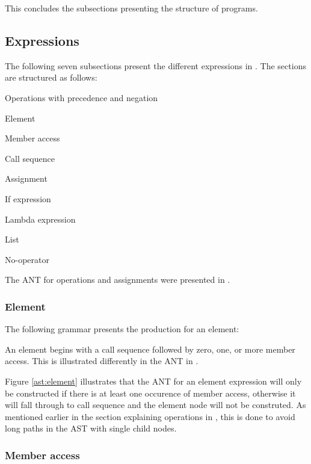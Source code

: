 This concludes the subsections presenting the structure of programs.

\subsection{Expressions}
The following seven subsections present the different expressions in
\productname{}. The sections are structured as follows:

\begin{dlist}
  \item Operations with precedence and negation
  \item Element
  \item Member access
  \item Call sequence
  \item Assignment
  \item If expression
  \item Lambda expression
  \item List
  \item No-operator
\end{dlist}

The ANT for operations and assignments were presented in .

\subsubsection{Element}
The following grammar presents the production for an element:

\begin{ebnf}
\end{ebnf}

An element begins with a call sequence followed by zero, one, or more member
access. This is illustrated differently in the ANT in .



Figure \ref{ast:element} illustrates that the ANT for an element expression will
only be constructed if there is at least one occurence of member access,
otherwise it will fall through to call sequence and the element node will not be
construted. As mentioned earlier in the section explaining operations in
\productname{}, this is done to avoid long paths in the AST with single child
nodes.

\subsubsection{Member access}

